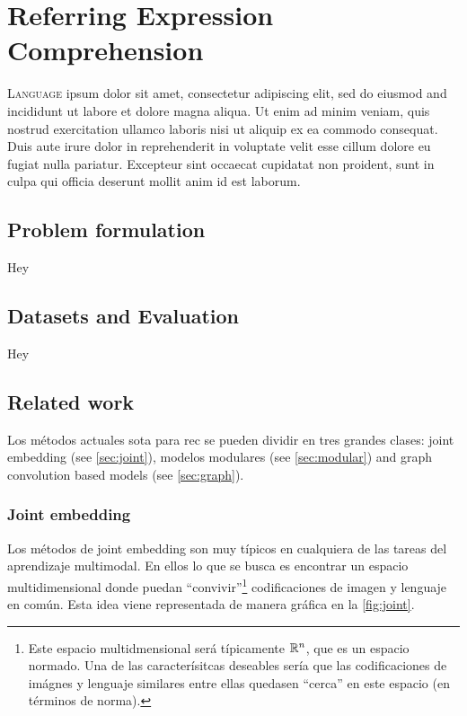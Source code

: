 

\chapter{Referring Expression Comprehension}



\lettrine{L}{anguage} ipsum dolor sit amet, consectetur
adipiscing elit, sed do eiusmod and incididunt ut labore et dolore magna
aliqua. Ut enim ad minim veniam, quis nostrud exercitation ullamco laboris nisi
ut aliquip ex ea commodo consequat. Duis aute irure dolor in reprehenderit in
voluptate velit esse cillum dolore eu fugiat nulla pariatur. Excepteur sint
occaecat cupidatat non proident, sunt in culpa qui officia deserunt mollit anim
id est laborum.


\section{Problem formulation}

Hey


\section{Datasets and Evaluation}

Hey


\section{Related work}

Los métodos actuales \gls{sota} para \gls{rec} se pueden dividir en tres
grandes clases: joint embedding (see \vref{sec:joint}), modelos modulares (see
\vref{sec:modular}) and graph convolution based models (see
\vref{sec:graph}).

\subsection{Joint embedding} \label{sec:joint}
Los métodos de joint embedding son muy típicos en cualquiera de las tareas del
aprendizaje multimodal. En ellos lo que se busca es encontrar un espacio
multidimensional donde puedan ``convivir''\footnote{Este espacio
multidmensional será típicamente \(\mathbb{R}^n\), que es un espacio normado. Una de
las caracterísitcas deseables sería que las codificaciones de imágnes y
lenguaje similares entre ellas quedasen ``cerca'' en este espacio (en términos
de norma).} codificaciones de imagen y lenguaje en común. Esta idea viene
representada de manera gráfica en la \vref{fig:joint}.

